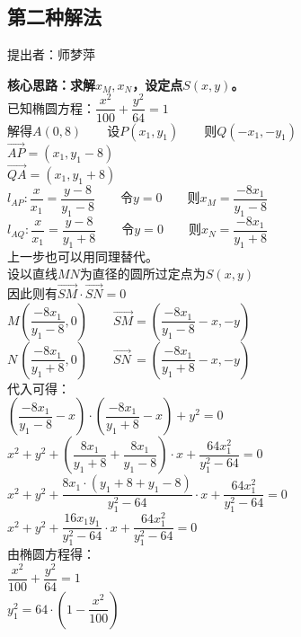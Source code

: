 \documentclass[UTF8]{ctexart}
\begin{document}
\subsection{第二种解法}
    \begin{center}
        提出者：师梦萍
    \end{center}
    \begin{multicols}{2}
        \small
        \textbf{核心思路：求解$x_M,x_N$，设定点$S(x,y)$。}\\[4mm]
        已知椭圆方程：$\dfrac{x^2}{100}+\dfrac{y^2}{64}=1$\\[5mm]
        解得$A(0,8)$~~~~设$P(x_1,y_1)$~~~~则$Q(-x_1,-y_1)$\\[5mm]
        $\overrightarrow{AP}=(x_1,y_1-8)$\\[5mm]
        $\overrightarrow{QA}=(x_1,y_1+8)$\\[5mm]
        $l_{AP}:\dfrac{x}{x_1}=\dfrac{y-8}{y_1-8}$~~~~令$y=0$~~~~则$x_M=\dfrac{-8x_1}{y_1-8}$\\[5mm]
        $l_{AQ}:\dfrac{x}{x_1}=\dfrac{y-8}{y_1+8}$~~~~令$y=0$~~~~则$x_N=\dfrac{-8x_1}{y_1+8}$\\[5mm]
        上一步也可以用同理替代。\\[8mm]
        设以直线$MN$为直径的圆所过定点为$S(x,y)$\\[3mm]
        因此则有$\overrightarrow{SM}\cdot\overrightarrow{SN}=0$\\[5mm]
        $M\left(\dfrac{-8x_1}{y_1-8},0\right)$~~~~$\overrightarrow{SM}=\left(\dfrac{-8x_1}{y_1-8}-x,-y\right)$\\[5mm]
        $N\,\left(\dfrac{-8x_1}{y_1+8},0\right)$~~~~$\overrightarrow{SN}\,=\left(\dfrac{-8x_1}{y_1+8}-x,-y\right)$\\[12mm]
        代入可得：\\[5mm]
        $\left(\dfrac{-8x_1}{y_1-8}-x\right)\cdot\left(\dfrac{-8x_1}{y_1+8}-x\right)+y^2=0$\\[5mm]
        $x^2+y^2+\left(\dfrac{8x_1}{y_1+8}+\dfrac{8x_1}{y_1-8}\right)\cdot x+\dfrac{64x_1^2}{y_1^2-64}=0$\\[5mm]
        $x^2+y^2+\dfrac{8x_1\cdot(y_1+8+y_1-8)}{y_1^2-64}\cdot x+\dfrac{64x_1^2}{y_1^2-64}=0$\\[5mm]
        $x^2+y^2+\dfrac{16x_1y_1}{y_1^2-64}\cdot x+\dfrac{64x_1^2}{y_1^2-64}=0$\\[30mm]
        由椭圆方程得：\\[5mm]
        $\dfrac{x^2}{100}+\dfrac{y^2}{64}=1$\\[5mm]
        $y_1^2=64\cdot\left(1-\dfrac{x^2}{100}\right)$\\[5mm]

\end{multicols}
\end{document}
